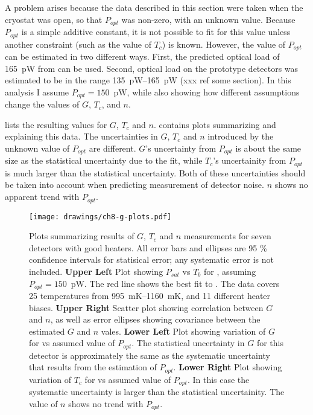 A problem arises because the data described in this section were taken when the cryostat was open, so that $P_{opt}$ was non-zero, with an unknown value.
Because $P_{opt}$ is a simple additive constant, it is not possible to fit for this value unless another constraint (such as the value of $T_c$) is known.
However, the value of $P_{opt}$ can be estimated in two different ways. 
First, the predicted optical load of 165~pW from  can be used.
Second, optical load on the prototype detectors was estimated to be in the range 135~pW--165~pW (xxx ref some section).
In this analysis I assume $P_{opt} = 150$~pW, while also showing how different assumptions change the values of  $G$, $T_c$, and $n$.

 lists the resulting values for $G$, $T_c$ and $n$.
 contains plots summarizing and explaining this data.
The uncertainties in $G$, $T_c$ and $n$ introduced by the unknown value of $P_{opt}$ are different.
$G$'s uncertainty from $P_{opt}$ is about the same size as the statistical uncertainty due to the fit, while $T_c$'s uncertainity from $P_{opt}$ is much larger than the statistical uncertainty.
Both of these uncertainties should be taken into account when predicting measurement of detector noise.
$n$ shows no apparent trend with $P_{opt}$.

\begin{figure*}
\texttt{[image: drawings/ch8-g-plots.pdf]}
\caption{Plots summarizing results of $G$, $T_c$ and $n$ measurements for seven detectors with good heaters.
All error bars and ellipses are 95 \% confidence intervals for statisical error; any systematic error is not included.
\textbf{Upper Left} Plot showing $P_{sat}$ vs $T_b$ for , assuming $P_{opt} = 150$~pW.
The red line shows the best fit to .
The data covers 25 temperatures from 995~mK--1160~mK, and 11 different heater biases.
\textbf{Upper Right} Scatter plot showing correlation between $G$ and $n$, as well as error ellipses showing covariance between the estimated $G$ and $n$ vales.
\textbf{Lower Left} Plot showing variation of $G$ for  vs assumed value of $P_{opt}$.
The statistical uncertainty in $G$ for this detector is approximately the same as the systematic uncertainty that results from the estimation of $P_{opt}$.
\textbf{Lower Right} Plot showing variation of $T_c$ for  vs assumed value of $P_{opt}$.
In this case the systematic uncertainty is larger than the statistical uncertainity.
The value of $n$ shows no trend with $P_{opt}$.
} 
\label{fig:heater-g-plots}
\end{figure*}

